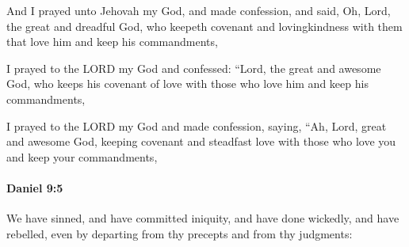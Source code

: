 			\begin{versebox}
					\item[BHS] 
					\item[LXX] 
					\item[ASV] And I prayed unto Jehovah my God, and made confession, and said, Oh, Lord, the great and dreadful God, who keepeth covenant and lovingkindness with them that love him and keep his commandments,
					\item[NIV] I prayed to the LORD my God and confessed: “Lord, the great and awesome God, who keeps his covenant of love with those who love him and keep his commandments,
					\item[NRSV] I prayed to the LORD my God and made confession, saying, “Ah, Lord, great and awesome God, keeping covenant and steadfast love with those who love you and keep your commandments,
			\end{versebox}

		\paragraph{Daniel 9:5} %
			\label{DANIEL-9-5}

			We have sinned, and have committed iniquity, and have done wickedly, and have rebelled, even by departing from thy precepts and from thy judgments:

